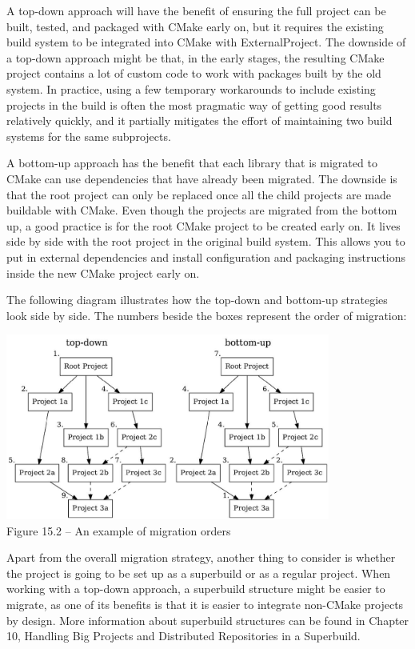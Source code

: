 A top-down approach will have the benefit of ensuring the full project can be built, tested, and packaged with CMake early on, but it requires the existing build system to be integrated into CMake with ExternalProject. The downside of a top-down approach might be that, in the early stages, the resulting CMake project contains a lot of custom code to work with packages built by the old system. In practice, using a few temporary workarounds to include existing projects in the build is often the most pragmatic way of getting good results relatively quickly, and it partially mitigates the effort of maintaining two build systems for the same subprojects.

A bottom-up approach has the benefit that each library that is migrated to CMake can use dependencies that have already been migrated. The downside is that the root project can only be replaced once all the child projects are made buildable with CMake. Even though the projects are migrated from the bottom up, a good practice is for the root CMake project to be created early on. It lives side by side with the root project in the original build system. This allows you to put in external dependencies and install configuration and packaging instructions inside the new CMake project early on.

The following diagram illustrates how the top-down and bottom-up strategies look side by side. The numbers beside the boxes represent the order of migration:

\begin{center}
\includegraphics[width=0.8\textwidth]{content/3/chapter15/images/2.jpg}\\
Figure 15.2 – An example of migration orders
\end{center}

Apart from the overall migration strategy, another thing to consider is whether the project is going to be set up as a superbuild or as a regular project. When working with a top-down approach, a superbuild structure might be easier to migrate, as one of its benefits is that it is easier to integrate non-CMake projects by design. More information about superbuild structures can be found in Chapter 10, Handling Big Projects and Distributed Repositories in a Superbuild.

